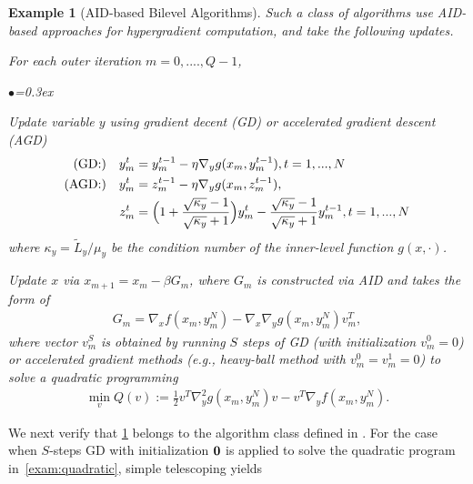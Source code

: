\documentclass{osudissert96}
\newtheorem{example}{Example}
\begin{document}
\begin{example}[AID-based Bilevel Algorithms]\label{exam:aids}\cite{domke2012generic,pedregosa2016hyperparameter,grazzi2020iteration,ji2020bilevel} Such a class of algorithms use AID-based approaches for hypergradient computation, and take the following updates.

\vspace{0.2cm}
\noindent For each outer iteration $m=0,....,Q-1$,
\begin{list}{$\bullet$}{\topsep=0.3ex \leftmargin=0.11in  \itemsep =0.01in}
\item  Update variable $y$ using gradient decent (GD) or accelerated gradient descent (AGD)
\begin{align} 
(\mbox{\normalfont GD:})\quad y_{m}^t &=  y_m^{t-1} - \eta \nabla_y g(x_m, y_m^{t-1}), t=1,...,N \nonumber
\\ (\mbox{\normalfont AGD:}) \quad y_m^{t} &= z_m^{t-1} - \eta \nabla_y g(x_m,z_m^{t-1}),  \nonumber
\\z_m^{t} &= \Big(1+\frac{\sqrt{\kappa_y}-1}{\sqrt{\kappa_y}+1}\Big) y_m^{t} - \frac{\sqrt{\kappa_y}-1}{\sqrt{\kappa_y}+1} y_m^{t-1}, t= 1,...,N 
\end{align}
where $\kappa_y= \widetilde L_y/\mu_y$ be the condition number of the inner-level function $g(x,\cdot)$. 
\item Update $x$ via $x_{m+1} = x_{m}-\beta G_m$, where $G_m$ is constructed via AID and takes the form of 
\begin{align}\label{aid_hgd}
G_m = \nabla_x f(x_m,y_m^N)- \nabla_x \nabla_y g(x_m,y_m^N)v_m^T, %
\end{align}
where vector $v_m^S$ is obtained by running $S$ steps of GD (with initialization $v_m^0=0$) or accelerated gradient methods (e.g., heavy-ball method with $v_m^0 = v_m^1=0$) to solve a quadratic programming
\begin{align}\label{exam:quadratic}
\min_{v} Q(v):= \frac{1}{2}v^T\nabla_y^2 g(x_m,y_m^N)v-v^T\nabla_y f(x_m,y_m^N).
\end{align}
\end{list}
\end{example}
We next verify that \cref{exam:aids} belongs  to the algorithm class defined in .  
For the case when $S$-steps GD with initialization $\bf{0}$ is applied to solve the quadratic program in~\cref{exam:quadratic}, simple telescoping yields 
\end{document}
